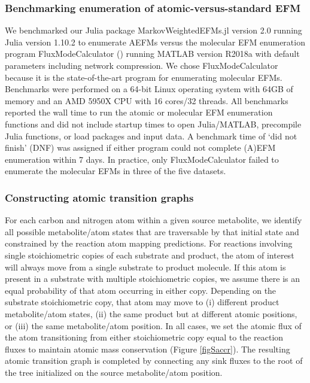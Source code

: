 \documentclass[12pt]{article}
\begin{document}
\subsubsection*{Benchmarking enumeration of atomic-versus-standard EFM}

We benchmarked our Julia package MarkovWeightedEFMs.jl version 2.0
running Julia version 1.10.2 to enumerate
AEFMs versus the molecular EFM enumeration program FluxModeCalculator
(\cite{vanKlinkenJanBert2016Faet}) running MATLAB version R2018a with
default parameters including network compression. We chose
FluxModeCalculator because it is the state-of-the-art program for
enumerating molecular EFMs. Benchmarks were performed on a 64-bit Linux
operating system with 64GB of memory and an AMD 5950X CPU with 16 cores/32
threads. All benchmarks reported the wall time to run the atomic or
molecular EFM enumeration functions and did not include startup times to
open Julia/MATLAB, precompile Julia functions, or load packages and input
data. A benchmark time of `did not finish' (DNF) was assigned if either
program could not complete (A)EFM enumeration within 7 days. In practice,
only FluxModeCalculator failed to enumerate the molecular EFMs in three of
the five datasets.

\subsubsection*{Constructing atomic transition graphs}

For each carbon and nitrogen atom within a given source metabolite, we
identify all possible metabolite/atom states that are traversable by that
initial state and constrained by the reaction atom mapping predictions.
For reactions involving single stoichiometric copies of each substrate and
product, the atom of interest will always move from a single substrate to
product molecule. If this atom is present in a substrate with multiple
stoichiometric copies, we assume there is an equal probability of that
atom occurring in either copy. Depending on the substrate stoichiometric
copy, that atom may move to (i) different product metabolite/atom states,
(ii) the same product but at different atomic positions, or (iii) the same
metabolite/atom position. In all cases, we set the atomic flux of the atom
transitioning from either stoichiometric copy equal to the reaction fluxes
to maintain atomic mass conservation (Figure \ref{figSaccr}). The
resulting atomic transition graph is completed by connecting any sink
fluxes to the root of the tree initialized on the source metabolite/atom
position. 
\end{document}
